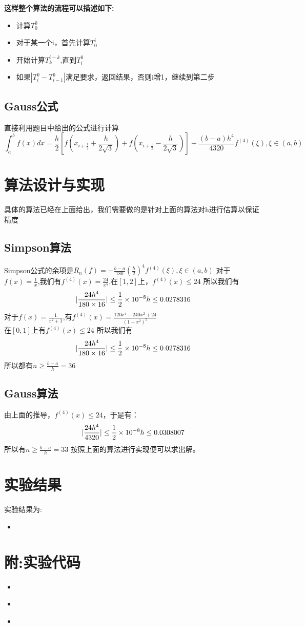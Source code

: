 \documentclass{article}
\newcommand{\pyscript}[2]{
\begin{itemize}
\item[]
\end{itemize}
}
\begin{document}
\textbf{这样整个算法的流程可以描述如下:}

\begin{itemize}
\item 计算$T_0^0$
\item 对于某一个i，首先计算$T_0^i$
\item 开始计算$T_k^{i-k}$,直到$T^0_{i}$
\item 如果$|T^0_i - T^0_{i-1}|$满足要求，返回结果，否则i增1，继续到第二步
\end{itemize}

\subsection{Gauss公式}
直接利用题目中给出的公式进行计算
$$
\int_a^b{f(x)dx} = \frac{h}{2}\left[ f(x_{i+\frac{1}{2}} + \frac{h}{2\sqrt{3}})+f(x_{i+\frac{1}{2}} - \frac{h}{2\sqrt{3}})  \right] + \frac{(b-a)h^4}{4320}f^{(4)}(\xi),\xi\in(a,b)
$$
\section{算法设计与实现}
具体的算法已经在上面给出，我们需要做的是针对上面的算法对h进行估算以保证精度
\subsection{Simpson算法}
Simpson公式的余项是$R_n(f) = -\frac{b-a}{180}(\frac{h}{2})^4f^{(4)}(\xi),\xi\in(a,b)$
对于$f(x) = \frac{1}{x}$,我们有$f^{(4)}(x) = \frac{24}{x^5}$,在$[1,2]$上，$f^{(4)}(x) \leq 24$
所以我们有
$$
    |\frac{24h^4}{180\times 16}| \leq \frac{1}{2}\times10^{-8}\\
    h \leq 0.0278316
$$
对于$f(x) = \frac{1}{x^2+1}$,有$f^{(4)}(x) = \frac{120x^4-240x^2+24}{(1+x^2)^5}$\\
在$[0,1]$上有$f^{(4)}(x)\leq 24$
所以我们有
$$
    |\frac{24h^4}{180\times 16}| \leq \frac{1}{2}\times10^{-8}\\
    h \leq 0.0278316
$$
所以都有$n \geq \frac{b-a}{h} = 36$
\subsection{Gauss算法}
由上面的推导，$f^{(4)}(x) \leq 24$，于是有：
$$
    |\frac{24h^4}{4320}|\leq \frac{1}{2}\times10^{-8}\\
     h \leq 0.0308007
$$
所以有$n \geq \frac{b-a}{h} = 33$
按照上面的算法进行实现便可以求出解。
\section{实验结果}
实验结果为:
\pyscript{result}{实验结果}
\section{附:实验代码}
\pyscript{simpson}{simpson公式求解}
\pyscript{romberg}{romberg外推求解}
\pyscript{gauss}{Gauss公式求解}
\end{document}
